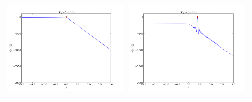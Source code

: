 \documentclass[12pt,a4paper,titlepage]{article}
\begin{document}
\begin{table}[ht]
\begin{tabular}{cc}
\includegraphics[scale=0.3]{likelihood_hopf0}&\includegraphics[scale=0.3]{likelihood_hopf04}\\
\newline

\end{tabular}
\end{table}
\end{document}

